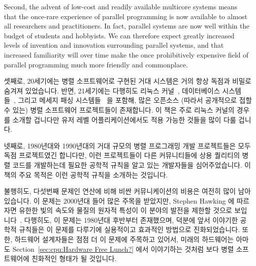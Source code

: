 Second, the advent of low-cost and readily available multicore systems
means that the once-rare experience of parallel programming is
now available to almost all researchers and practitioners.
In fact, parallel systems are now well within the budget of students
and hobbyists.
We can therefore expect greatly increased levels of invention and
innovation surrounding parallel systems, and that increased familiarity
will over time make the once prohibitively expensive field of parallel
programming much more friendly and commonplace.
\fi

셋째로, 20세기에는 병렬 소프트웨어로 구현된 거대 시스템은 거의 항상 독점과
비밀로 숨겨져 있었습니다.
반면, 21세기에는 다행히도 리눅스
커널~\cite{Torvalds2.6kernel}, 데이터베이스
시스템들~\cite{PostgreSQL2008,MySQL2008}, 그리고 메세지 패싱
시스템들~\cite{OpenMPI2008,BOINC2008} 을 포함해, 많은 오픈소스 (따라서
공개적으로 접할 수 있는) 병렬 소프트웨어 프로젝트들이 존재합니다.
이 책은 주로 리눅스 커널의 경우를 소개할 겁니다만 유저 레벨 어플리케이션에서도
적용 가능한 것들을 많이 다룰 겁니다.

넷째로, 1980년대와 1990년대의 거대 규모의 병렬 프로그래밍 개발 프로젝트들은
모두 독점 프로젝트였긴 합니다만, 이런 프로젝트들이 다른 커뮤니티들에 상용
퀄리티의 병렬 코드를 개발하는데 필요한 공학적 규칙을 알고 있는 개발자들을
심어주었습니다.
이 책의 주요 목적은 이런 공학적 규칙을 소개하는 것입니다.

불행히도, 다섯번째 문제인 연산에 비해 비싼 커뮤니케이션의 비용은 여전히 많이
남아있습니다.
이 문제는 2000년대 들어 많은 주목을 받았지만, Stephen Hawking 에 따르자면
유한한 빛의 속도와 물질의 원자적 특성이 이 분야의 발전을 제한할 것으로
보입니다~\cite{BryanGardiner2007,GordonMoore03a}.
다행히도, 이 문제는 1980년대 후반부터 존재했으며, 덕분에 앞서 이야기한 공학적
규칙들은 이 문제를 다루기에 실용적이고 효과적인 방법으로 진화되었습니다.
또한, 하드웨어 설계자들은 점점 더 이 문제에 주목하고 있어서, 미래의 하드웨어는
아마도 Section~\ref{sec:cpu:Hardware Free Lunch?} 에서 이야기하는 것처럼 보다
병렬 소프트웨어에 친화적인 형태가 될 것입니다.
\iffalse

